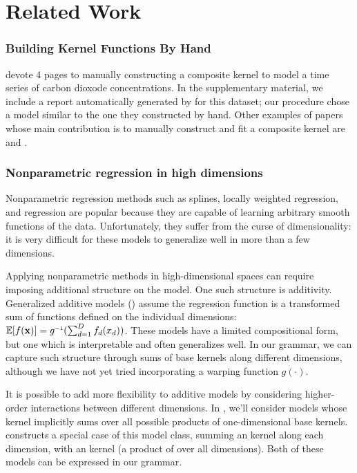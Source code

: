 




\section{Related Work}
\label{sec:related-work}

\def\rwsheader{\subsubsection}

\rwsheader{Building Kernel Functions By Hand}
\cite{rasmussen38gaussian} devote 4 pages to manually constructing a composite kernel to model a time series of carbon dioxode concentrations.
In the supplementary material, we include a report automatically generated by \procedurename{} for this dataset; our procedure chose a model similar to the one they constructed by hand.
Other examples of papers whose main contribution is to manually construct and fit a composite \gp{} kernel are \cite{klenske2012nonparametric} and \cite{lloydgefcom2012}.


\rwsheader{Nonparametric regression in high dimensions}
Nonparametric regression methods such as splines, locally weighted regression, and \gp{} regression are popular because they are capable of learning arbitrary smooth functions of the data.
Unfortunately, they suffer from the curse of dimensionality: it is very difficult for these models to generalize well in more than a few dimensions.

Applying nonparametric methods in high-dimensional spaces can require imposing additional structure on the model.
One such structure is additivity.
Generalized additive models (\GAM{}) assume the regression function is a transformed sum of functions defined on the individual dimensions: $\expect[f(\vx)] = g\inv(\sum_{d=1}^D f_d(x_d))$.
These models have a limited compositional form, but one which is interpretable and often generalizes well.
In our grammar, we can capture such structure through sums of base kernels along different dimensions, although we have not yet tried incorporating a warping function $g(\cdot)$.

It is possible to add more flexibility to additive models by considering higher-order interactions between different dimensions. 
In , we'll consider \gp{} models whose kernel implicitly sums over all possible products of one-dimensional base kernels.
\citet{plate1999accuracy} constructs a special case of this model class, summing an \kSE{} kernel along each dimension, with an \seard{} kernel (a product of \kSE{} over all dimensions).
Both of these models can be expressed in our grammar.

